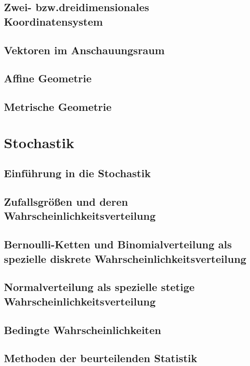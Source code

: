 \documentclass{article}
\begin{document}
        \subsection{Zwei- bzw.dreidimensionales Koordinatensystem}
        \subsection{Vektoren im Anschauungsraum}
        \subsection{Affine Geometrie}
        \subsection{Metrische Geometrie}

    \section{Stochastik}
        \subsection{Einführung in die Stochastik}
        \subsection{Zufallsgrößen und deren Wahrscheinlichkeitsverteilung}
        \subsection{Bernoulli-Ketten und Binomialverteilung als spezielle diskrete Wahrscheinlichkeitsverteilung}
        \subsection{Normalverteilung als spezielle stetige Wahrscheinlichkeitsverteilung}
        \subsection{Bedingte Wahrscheinlichkeiten}
        \subsection{Methoden der beurteilenden Statistik}
\end{document}

